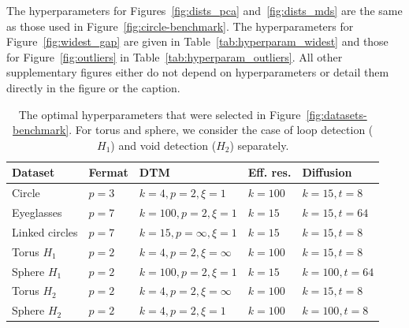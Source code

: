 \documentclass{article}
\theoremstyle{plain}
\theoremstyle{definition}
\theoremstyle{remark}
\begin{document}
The hyperparameters for Figures~\ref{fig:dists_pca}
and~\ref{fig:dists_mds} are the same as those used in Figure~\ref{fig:circle-benchmark}. The hyperparameters for Figure~\ref{fig:widest_gap} are given in Table~\ref{tab:hyperparam_widest} and those for Figure~\ref{fig:outliers} in Table~\ref{tab:hyperparam_outliers}. All other supplementary figures either do not depend on hyperparameters or detail them directly in the figure or the caption.
\begin{table}[t]
    \centering
    \caption{The optimal hyperparameters that were  selected in Figure~\ref{fig:datasets-benchmark}. For torus and sphere, we consider the case of loop detection ($H_1$) and void detection ($H_2$) separately.}
    \begin{tabular}{lllll}
        \toprule
        Dataset & Fermat & DTM & Eff. res. & Diffusion\\
        \midrule
        Circle         & $p=3$ & $k=4, p=2, \xi=1$ & $k=100$ & $k=15, t=8$ \\
        Eyeglasses     & $p=7$ & $k=100, p=2, \xi=1$ & $k=15$  & $k=15, t=64$ \\
        Linked circles & $p=7$ & $k=15, p=\infty, \xi=1$ & $k=15$  & $k=15, t=8$ \\
        Torus $H_1$       & $p=2$ & $k=4, p=2, \xi=\infty$ & $k=100$ & $k=15, t=8$ \\
        Sphere $H_1$      & $p=2$ & $k=100, p=2,\xi=1$ & $k=15$  & $k=100, t=64$\\
        Torus $H_2$       & $p=2$ & $k=4, p=2, \xi=\infty$ & $k=100$ & $k=15, t=8$\\
        Sphere $H_2$      & $p=2$ & $k=4, p=2, \xi=1$ & $k=100$ & $k=100, t=8$ \\
        \bottomrule
    \end{tabular}
    \label{tab:hyperparam_datasets}
\end{table}
\end{document}
